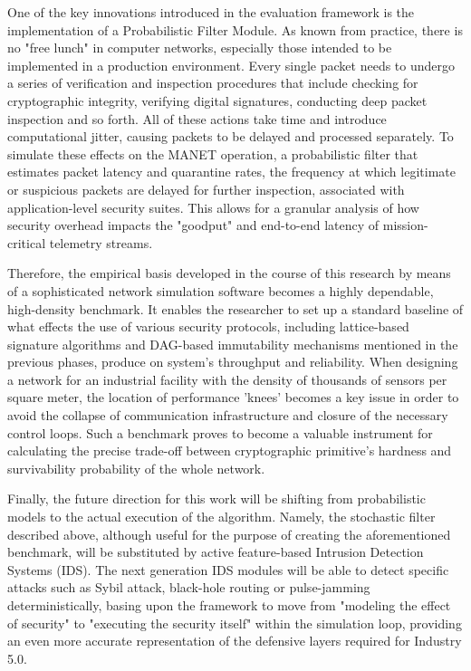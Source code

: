 \documentclass[a4paper,fleqn]{cas-dc}
\numberwithin{equation}{section}
\begin{document}
One of the key innovations introduced in the evaluation framework is the implementation of a Probabilistic Filter Module. As known from practice, there is no "free lunch" in computer networks, especially those intended to be implemented in a production environment. Every single packet needs to undergo a series of verification and inspection procedures that include checking for cryptographic integrity, verifying digital signatures, conducting deep packet inspection and so forth. All of these actions take time and introduce computational jitter, causing packets to be delayed and processed separately. To simulate these effects on the MANET operation, a probabilistic filter that estimates packet latency and quarantine rates, the frequency at which legitimate or suspicious packets are delayed for further inspection, associated with application-level security suites. This allows for a granular analysis of how security overhead impacts the "goodput" and end-to-end latency of mission-critical telemetry streams.

Therefore, the empirical basis developed in the course of this research by means of a sophisticated network simulation software becomes a highly dependable, high-density benchmark. It enables the researcher to set up a standard baseline of what effects the use of various security protocols, including lattice-based signature algorithms and DAG-based immutability mechanisms mentioned in the previous phases, produce on system's throughput and reliability. When designing a network for an industrial facility with the density of thousands of sensors per square meter, the location of performance 'knees' becomes a key issue in order to avoid the collapse of communication infrastructure and closure of the necessary control loops. Such a benchmark proves to become a valuable instrument for calculating the precise trade-off between cryptographic primitive's hardness and survivability probability of the whole network.

Finally, the future direction for this work will be shifting from probabilistic models to the actual execution of the algorithm. Namely, the stochastic filter described above, although useful for the purpose of creating the aforementioned benchmark, will be substituted by active feature-based Intrusion Detection Systems (IDS). The next generation IDS modules will be able to detect specific attacks such as Sybil attack, black-hole routing or pulse-jamming deterministically, basing upon the framework to move from "modeling the effect of security" to "executing the security itself" within the simulation loop, providing an even more accurate representation of the defensive layers required for Industry 5.0.
\end{document}
